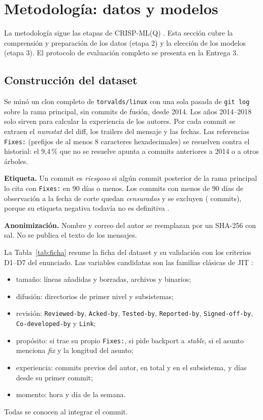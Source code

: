 \section{Metodología: datos y modelos}

La metodología sigue las etapas de CRISP-ML(Q) \cite{Studer2021}. Esta sección cubre la comprensión y preparación de los datos (etapa 2) y la elección de los modelos (etapa 3). El protocolo de evaluación completo se presenta en la Entrega 3.

\subsection{Construcción del dataset}

Se minó un clon completo de \texttt{torvalds/linux} con una sola pasada de \texttt{git log} sobre la rama principal, sin commits de fusión, desde 2014. Los años 2014--2018 solo sirven para calcular la experiencia de los autores. Por cada commit se extraen el \emph{numstat} del diff, los trailers del mensaje y las fechas. Las referencias \texttt{Fixes:} (prefijos de al menos 8 caracteres hexadecimales) se resuelven contra el historial: el 9,4\,\% que no se resuelve apunta a commits anteriores a 2014 o a otros árboles.

\textbf{Etiqueta.} Un commit es \emph{riesgoso} si algún commit posterior de la rama principal lo cita con \texttt{Fixes:} en 90 días o menos. Los commits con menos de 90 días de observación a la fecha de corte quedan \emph{censurados} y se excluyen (\cifCensurados{} commits), porque su etiqueta negativa todavía no es definitiva \cite{Falessi2022,Cabral2019}.

\textbf{Anonimización.} Nombre y correo del autor se reemplazan por un SHA-256 con sal. No se publica el texto de los mensajes.

La Tabla~\ref{tab:ficha} resume la ficha del dataset y su validación con los criterios D1--D7 del enunciado. Las \cifNVariables{} variables candidatas son las familias clásicas de JIT \cite{Kamei2013}:
\begin{itemize}
\item tamaño: líneas añadidas y borradas, archivos y binarios;
\item difusión: directorios de primer nivel y subsistemas;
\item revisión: \texttt{Reviewed-by}, \texttt{Acked-by}, \texttt{Tested-by}, \texttt{Reported-by}, \texttt{Signed-off-by}, \texttt{Co-developed-by} y \texttt{Link};
\item propósito: si trae su propio \texttt{Fixes:}, si pide backport a \emph{stable}, si el asunto menciona \emph{fix} y la longitud del asunto;
\item experiencia: commits previos del autor, en total y en el subsistema, y días desde su primer commit;
\item momento: hora y día de la semana.
\end{itemize}
Todas se conocen al integrar el commit.

